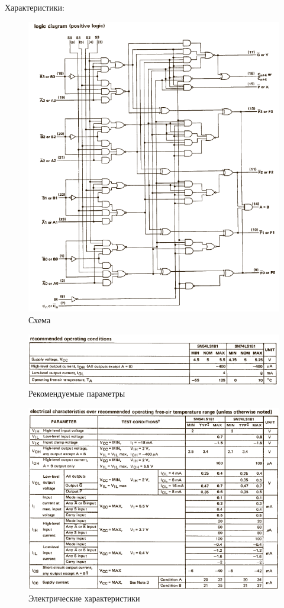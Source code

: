 Характеристики:

\begin{figure}[H]
	\centering
	\includegraphics[width=0.95\linewidth]{imgs/15/15_sh}
	\caption{Схема}
	\label{fig:15_sh}
\end{figure}

\begin{figure}[H]
	\centering
	\includegraphics[width=0.95\linewidth]{imgs/15/15_rec}
	\caption{Рекомендуемые параметры}
	\label{fig:15_rec}
\end{figure}

\begin{figure}[H]
	\centering
	\includegraphics[width=0.95\linewidth]{imgs/15/15_el}
	\caption{Электрические характеристики}
	\label{fig:15_el}
\end{figure}

